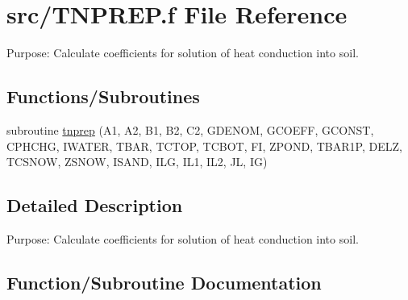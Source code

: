 \hypertarget{TNPREP_8f}{}\section{src/\+T\+N\+P\+R\+E\+P.f File Reference}
\label{TNPREP_8f}


Purpose\+: Calculate coefficients for solution of heat conduction into soil.  


\subsection*{Functions/\+Subroutines}
\begin{DoxyCompactItemize}
\item 
subroutine \hyperlink{TNPREP_8f_ab5cfd35272325655f17bcc52acb00535}{tnprep} (A1, A2, B1, B2, C2, G\+D\+E\+N\+O\+M, G\+C\+O\+E\+F\+F, G\+C\+O\+N\+S\+T, C\+P\+H\+C\+H\+G, I\+W\+A\+T\+E\+R, T\+B\+A\+R, T\+C\+T\+O\+P, T\+C\+B\+O\+T, F\+I, Z\+P\+O\+N\+D, T\+B\+A\+R1\+P, D\+E\+L\+Z, T\+C\+S\+N\+O\+W, Z\+S\+N\+O\+W, I\+S\+A\+N\+D, I\+L\+G, I\+L1, I\+L2, J\+L, I\+G)
\end{DoxyCompactItemize}


\subsection{Detailed Description}
Purpose\+: Calculate coefficients for solution of heat conduction into soil. 



\subsection{Function/\+Subroutine Documentation}
\hypertarget{TNPREP_8f_ab5cfd35272325655f17bcc52acb00535}{}
